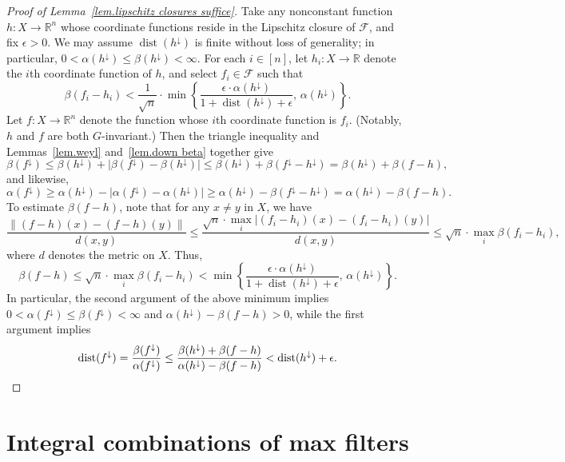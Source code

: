 \documentclass{article}
\theoremstyle{plain}
\theoremstyle{definition}
\begin{document}
\begin{proof}[Proof of Lemma~\ref{lem.lipschitz closures suffice}]
Take any nonconstant function $h\colon X\to\mathbb{R}^n$ whose coordinate functions reside in the Lipschitz closure of $\mathcal{F}$, and fix $\epsilon>0$.
We may assume $\operatorname{dist}(h^\downarrow)$ is finite without loss of generality; in particular, $0<\alpha(h^\downarrow)\leq\beta(h^\downarrow)<\infty$.
For each $i\in[n]$, let $h_i\colon X\to\mathbb{R}$ denote the $i$th coordinate function of $h$, and select $f_i\in\mathcal{F}$ such that
\[
\beta(f_i-h_i)
<\frac{1}{\sqrt{n}}\cdot\min\left\{\frac{\epsilon\cdot\alpha(h^\downarrow)}{1+\operatorname{dist}(h^\downarrow)+\epsilon},\,\alpha(h^\downarrow)\right\}.
\]
Let $f\colon X\to\mathbb{R}^n$ denote the function whose $i$th coordinate function is $f_i$.
(Notably, $h$ and $f$ are both $G$-invariant.)
Then the triangle inequality and Lemmas~\ref{lem.weyl} and~\ref{lem.down beta} together give
\[
\beta(f^\downarrow)
\leq\beta(h^\downarrow)+|\beta(f^\downarrow)-\beta(h^\downarrow)|
\leq\beta(h^\downarrow)+\beta(f^\downarrow-h^\downarrow)
=\beta(h^\downarrow)+\beta(f-h),
\]
and likewise,
\[
\alpha(f^\downarrow)
\geq\alpha(h^\downarrow)-|\alpha(f^\downarrow)-\alpha(h^\downarrow)|
\geq\alpha(h^\downarrow)-\beta(f^\downarrow-h^\downarrow)
=\alpha(h^\downarrow)-\beta(f-h).
\]
To estimate $\beta(f-h)$, note that for any $x\neq y$ in $X$, we have
\[
\frac{\|(f-h)(x)-(f-h)(y)\|}{d(x,y)}
\leq\frac{\sqrt{n}\cdot\max_i|(f_i-h_i)(x)-(f_i-h_i)(y)|}{d(x,y)}
\leq\sqrt{n}\cdot\max_i\beta(f_i-h_i),
\]
where $d$ denotes the metric on $X$.
Thus,
\[
\beta(f-h)
\leq\sqrt{n}\cdot\max_i\beta(f_i-h_i)
<\min\left\{\frac{\epsilon\cdot\alpha(h^\downarrow)}{1+\operatorname{dist}(h^\downarrow)+\epsilon},\,\alpha(h^\downarrow)\right\}.
\]
In particular, the second argument of the above minimum implies $0<\alpha(f^\downarrow)\leq\beta(f^\downarrow)<\infty$ and $\alpha(h^\downarrow) - \beta(f-h) > 0$, while the first argument implies
\[
\operatorname{dist}(f^\downarrow)
=\frac{\beta(f^\downarrow)}{\alpha(f^\downarrow)}
\leq\frac{\beta(h^\downarrow)+\beta(f-h)}{\alpha(h^\downarrow)-\beta(f-h)}
<\operatorname{dist}(h^\downarrow)+\epsilon.
\qedhere
\]
\end{proof}

\section{Integral combinations of max filters}
\label{sec.integral}
\end{document}
